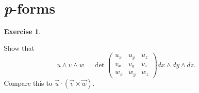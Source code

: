 \documentclass[11pt, a4paper]{report}
\theoremstyle{definition}
\newtheorem{ex}{Exercise}[part]
\begin{document}
\section{\emph{p}-forms}

\begin{ex}\label{ex:triplewedgeproduct}

Show that
\[
    u \wedge v \wedge w = \det \begin{pmatrix}
            u_x & u_y & u_z \\
            v_x & v_y & v_z \\
            w_x & w_y & w_z
        \end{pmatrix} dx \wedge dy \wedge dz.
\]
Compare this to $\vec{u} \cdot (\vec{v} \times \vec{w})$.

\end{ex}
\end{document}
